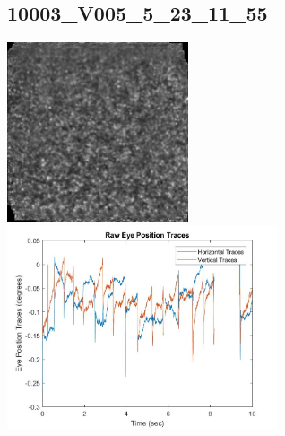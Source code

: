 \documentclass[11pt]{article}
\begin{document}
\subsection{10003\_V005\_5\_23\_11\_55}
\includegraphics[width=0.40\textwidth, valign=m]{referenceframes/aoslo/10003_V005_5_23_11_55_dwt_nostim_gamscaled_bandfilt_refframe.jpg}
\includegraphics[width=0.60\textwidth, valign=m]{eyepositiontraces/aoslo/10003_V005_5_23_11_55.jpg}\\
\end{document}
